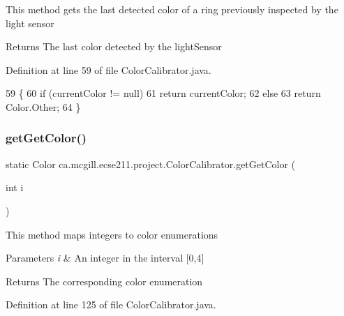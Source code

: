 This method gets the last detected color of a ring previously inspected by the light sensor

\begin{DoxyReturn}{Returns}
The last color detected by the light\+Sensor 
\end{DoxyReturn}


Definition at line 59 of file Color\+Calibrator.\+java.


\begin{DoxyCode}
59                                  \{
60     \textcolor{keywordflow}{if} (currentColor != null)
61       \textcolor{keywordflow}{return} currentColor;
62     \textcolor{keywordflow}{else}
63       \textcolor{keywordflow}{return} Color.Other;
64   \}
\end{DoxyCode}
\mbox{\label{classca_1_1mcgill_1_1ecse211_1_1project_1_1_color_calibrator_acb1d9cef0739971dbe00cc16712be0fe}} 
\subsubsection{\texorpdfstring{get\+Get\+Color()}{getGetColor()}}
{\footnotesize\ttfamily static Color ca.\+mcgill.\+ecse211.\+project.\+Color\+Calibrator.\+get\+Get\+Color (\begin{DoxyParamCaption}\item[{int}]{i }\end{DoxyParamCaption})\hspace{0.3cm}{\ttfamily [static]}}

This method maps integers to color enumerations


\begin{DoxyParams}{Parameters}
{\em i} & An integer in the interval \mbox{[}0,4\mbox{]} \\
\hline
\end{DoxyParams}
\begin{DoxyReturn}{Returns}
The corresponding color enumeration 
\end{DoxyReturn}


Definition at line 125 of file Color\+Calibrator.\+java.


